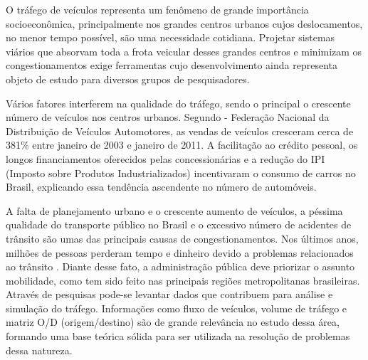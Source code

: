 
O tráfego de veículos representa um fenômeno de grande importância socioeconômica, principalmente nos grandes centros urbanos cujos deslocamentos, no menor tempo possível, são uma necessidade cotidiana. Projetar sistemas viários que absorvam toda a frota veicular desses grandes centros e minimizam os congestionamentos exige ferramentas cujo desenvolvimento ainda representa objeto de estudo para diversos grupos de pesquisadores.

Vários fatores interferem na qualidade do tráfego, sendo o principal o crescente número de veículos nos centros urbanos. Segundo \cite{fenabrave:2013:online} - Federação Nacional da Distribuição de Veículos Automotores, as vendas de veículos cresceram cerca de 381\% entre janeiro de 2003 e janeiro de 2011. A facilitação ao crédito pessoal, os longos financiamentos oferecidos pelas concessionárias e a redução do IPI (Imposto sobre Produtos Industrializados) incentivaram o consumo de carros no Brasil, explicando essa tendência ascendente no número de automóveis.


A falta de planejamento urbano e o crescente aumento de veículos, a péssima qualidade do transporte público no Brasil e o excessivo número de acidentes de trânsito são umas das principais causas de congestionamentos. Nos últimos anos, milhões de pessoas perderam tempo e dinheiro devido a problemas relacionados ao trânsito \citep{pamela:2012:masther}. Diante desse fato, a administração pública deve priorizar o assunto mobilidade, como tem sido feito nas principais regiões metropolitanas brasileiras. Através de pesquisas pode-se levantar dados que contribuem para análise e simulação do tráfego. Informações como fluxo de veículos, volume de tráfego e matriz O/D (origem/destino) são de grande relevância no estudo dessa área, formando uma base teórica sólida para ser utilizada na resolução de problemas dessa natureza.


